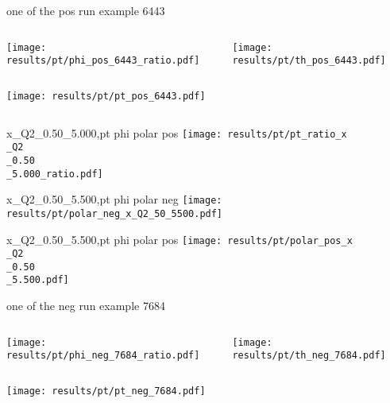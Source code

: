 \begin{frame}{one of the pos run example 6443}
\begin{columns}
\begin{column}[T]{0.5\textwidth}
\texttt{[image: results/pt/phi\_pos\_6443\_ratio.pdf]}
\end{column}
\begin{column}[T]{0.5\textwidth}
\texttt{[image: results/pt/th\_pos\_6443.pdf]}
\end{column}
\end{columns}
\begin{columns}
\begin{column}[T]{0.5\textwidth}
\texttt{[image: results/pt/pt\_pos\_6443.pdf]}
\end{column}
\begin{column}[T]{0.5\textwidth}
\end{column}
\end{columns}
\end{frame}
\begin{frame}{x\_Q2\_0.50\_5.000,pt phi polar pos}
\texttt{[image: results/pt/pt\_ratio\_x\\\_Q2\\\_0.50\\\_5.000\_ratio.pdf]}
\end{frame}
\begin{frame}{x\_Q2\_0.50\_5.500,pt phi polar neg}
\texttt{[image: results/pt/polar\_neg\_x\_Q2\_50\_5500.pdf]}
\end{frame}
\begin{frame}{x\_Q2\_0.50\_5.500,pt phi polar pos}
\texttt{[image: results/pt/polar\_pos\_x\\\_Q2\\\_0.50\\\_5.500.pdf]}
\end{frame}
\begin{frame}{one of the neg run example 7684}
\begin{columns}
\begin{column}[T]{0.5\textwidth}
\texttt{[image: results/pt/phi\_neg\_7684\_ratio.pdf]}
\end{column}
\begin{column}[T]{0.5\textwidth}
\texttt{[image: results/pt/th\_neg\_7684.pdf]}
\end{column}
\end{columns}
\texttt{[image: results/pt/pt\_neg\_7684.pdf]}
\end{frame}
